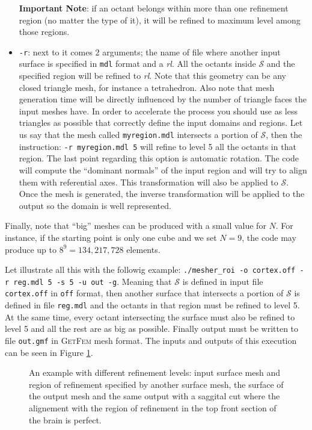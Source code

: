 \documentclass[10pt]{article}
\begin{document}
\begin{itemize}
\begin{minipage}[c]{0.65\textwidth}
\textbf{Important Note}: if an octant belongs within more than one refinement region (no matter the type of it), it will be refined to maximum level among those regions.
\end{minipage}
\item \texttt{-r}: next to it comes 2 arguments; the name of file where another input surface is specified in \texttt{mdl} format and a \textit{rl}. All the octants inside $\mathcal{S}$ and the specified region will be refined to \textit{rl}. Note that this geometry can be any closed triangle mesh, for instance a tetrahedron. Also note that mesh generation time will be directly influenced by the number of triangle faces the input meshes have. In order to accelerate the process you should use as less triangles as possible that correctly define the input domains and regions. Let us say that the mesh called \texttt{myregion.mdl} intersects a portion of $\mathcal{S}$, then the instruction: \texttt{-r myregion.mdl 5} will refine to level 5 all the octants in that region. The last point regarding this option is automatic rotation. The code will compute the ``dominant normals'' of the input region and will try to align them with referential axes. This transformation will also be applied to $\mathcal{S}$. Once the mesh is generated, the inverse transformation will be applied to the output so the domain is well represented.
\end{itemize}

Finally, note that ``big'' meshes can be produced with a small value for $N$. For instance, if the starting point is only one cube and we set $N=9$, the code may produce up to $8^9 = 134,217,728$ elements.

Let illustrate all this with the followig example: \texttt{./mesher\_roi -o cortex.off -r reg.mdl 5 -s 5 -u out -g}. Meaning that $\mathcal{S}$ is defined in input file \texttt{cortex.off} in \texttt{off} format, then another surface that intersects a portion of $\mathcal{S}$ is defined in file \texttt{reg.mdl} and the octants in that region must be refined to level 5. At the same time, every octant intersecting the surface must also be refined to level 5 and all the rest are as big as possible. Finally output must be written to file \texttt{out.gmf} in \textsc{GetFem} mesh format. The inputs and outputs of this execution can be seen in Figure \ref{f:mesheroi}.

 \begin{figure}[htb]
\centering
\caption{An example with different refinement levels:  input surface mesh and region of refinement specified by another surface mesh,  the surface of the output mesh and  the same output with a saggital cut where the alignement with the region of refinement in the top front section of the brain is perfect.}
\label{f:mesheroi}
\end{figure}
\end{document}
